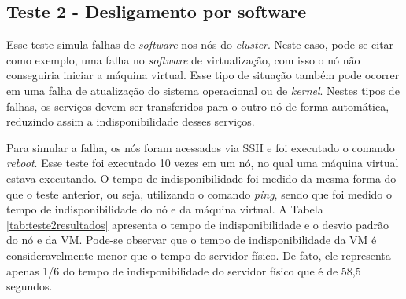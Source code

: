 % 


\subsection{Teste 2 - Desligamento por software}

Esse teste simula falhas de \textit{software} nos nós do \textit{cluster}. Neste caso, pode-se citar como exemplo, uma falha no \textit{software} 
de virtualização, com isso o nó não conseguiria iniciar a máquina virtual. Esse tipo de situação também pode ocorrer em uma falha de atualização 
do sistema operacional ou de \textit{kernel}.
Nestes tipos de falhas, os serviços devem ser transferidos para o outro nó de forma automática, reduzindo assim a indisponibilidade desses serviços. 

Para simular a falha, os nós foram acessados via \ac{SSH} e foi executado o comando \textit{reboot}. Esse teste foi executado 10 vezes em um nó, 
no qual uma máquina virtual estava executando. O tempo de indisponibilidade foi medido da mesma forma do que o teste anterior, ou seja, utilizando 
o comando \textit{ping}, sendo que foi medido o tempo de indisponibilidade do nó e da máquina virtual. A Tabela \ref{tab:teste2resultados} 
apresenta o tempo de indisponibilidade e o desvio padrão do nó e da \ac{VM}. Pode-se observar que o tempo de indisponibilidade da \ac{VM} é 
consideravelmente menor que o tempo do servidor físico. 
De fato, ele representa apenas 1/6 do tempo de indisponibilidade do servidor físico que é de 58,5 segundos. 


